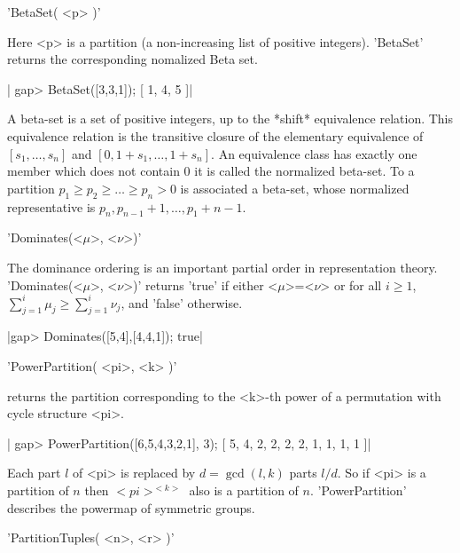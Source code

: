 %

'BetaSet( <p> )'

Here  <p>  is  a  partition  (a  non-increasing list of positive integers).
'BetaSet' returns the corresponding nomalized Beta set.

|    gap> BetaSet([3,3,1]);
      [ 1, 4, 5 ]|

A  beta-set is a  set of positive  integers, up to  the *shift* equivalence
relation.  This  equivalence  relation  is  the  transitive  closure of the
elementary  equivalence of $[s_1,\ldots,s_n]$ and $[0,1+s_1,\ldots,1+s_n]$.
An equivalence class has exactly one member which does not contain $0$\: it
is  called the normalized beta-set.  To a partition $p_1\ge p_2\ge\ldots\ge
p_n>0$  is  associated  a  beta-set,  whose  normalized  representative  is
$p_n,p_{n-1}+1,\ldots,p_1+n-1$.



'Dominates(<$\mu$>, <$\nu$>)'

The  dominance  ordering  is  an  important partial order in representation
theory.    'Dominates(<$\mu$>,   <$\nu$>)'   returns   'true'   if   either
<$\mu$>=<$\nu$> or for all $i\ge 1$,
$\sum_{j=1}^i\mu_j\ge\sum_{j=1}^i\nu_j$, and 'false' otherwise.

|gap> Dominates([5,4],[4,4,1]);
true|


'PowerPartition( <pi>, <k> )'

returns the  partition corresponding to the <k>-th power of a permutation
with cycle structure <pi>.

|    gap> PowerPartition([6,5,4,3,2,1], 3);
    [ 5, 4, 2, 2, 2, 2, 1, 1, 1, 1 ]|

Each part $l$ of <pi> is replaced by $d = \gcd(l, k)$ parts $l/d$.  So if
<pi> is a partition of $n$ then $<pi>^{<k>}$ also is a partition of  $n$.
'PowerPartition'  describes  the  powermap  of  symmetric   groups.

%

'PartitionTuples( <n>, <r> )'

